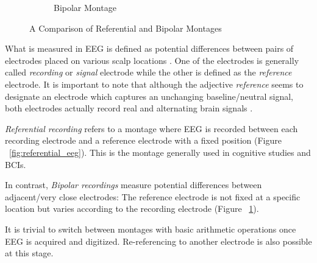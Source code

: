 \documentclass[12pt]{article}
\numberwithin{equation}{section}
\numberwithin{figure}{section}
\numberwithin{table}{section}
\begin{document}
\begin{figure}
\begin{subfigure}{.5\textwidth}
        \caption{Bipolar Montage}
        \label{fig:bipolar_eeg}
    \end{subfigure}
    \caption{A Comparison of Referential and Bipolar Montages}
    \label{fig:ref_bipolar_eeg}
\end{figure}


\par{
    What is measured in EEG is defined as potential differences between pairs
    of electrodes placed on various scalp locations \citep{nunez_electric_2006}.
    One of the electrodes is generally called \emph{recording} or \emph{signal}
    electrode while the other is defined as the \emph{reference} electrode. It is
    important to note that although the adjective \emph{reference} seems to
    designate an electrode which captures an unchanging baseline/neutral signal,
    both electrodes actually record real and alternating brain signals \citep{wolpaw_brain-computer_2012}.
}
\par{
    \emph{Referential recording} refers to a montage where EEG is recorded
    between each recording electrode and a reference electrode with a fixed position (Figure ~\ref{fig:referential_eeg}).
    This is the montage generally used in cognitive studies and BCIs.
}
\newpage
\par{
    In contrast, \emph{Bipolar recordings} measure potential differences between
    adjacent/very close electrodes: The reference electrode is not fixed at a
    specific location but varies according to the recording electrode (Figure ~\ref{fig:bipolar_eeg}).
}
\par{
    It is trivial to switch between montages with basic arithmetic operations once EEG is acquired and digitized.
    Re-referencing to another electrode is also possible at this stage.
}
\end{document}
